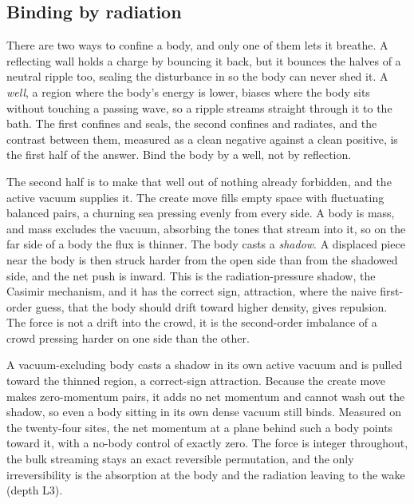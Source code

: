\subsection{Binding by radiation}

There are two ways to confine a body, and only one of them lets it breathe. A reflecting wall holds a charge by bouncing it back, but it bounces the halves of a neutral ripple too, sealing the disturbance in so the body can never shed it. A \emph{well}, a region where the body's energy is lower, biases where the body sits without touching a passing wave, so a ripple streams straight through it to the bath. The first confines and seals, the second confines and radiates, and the contrast between them, measured as a clean negative against a clean positive, is the first half of the answer. Bind the body by a well, not by reflection.

The second half is to make that well out of nothing already forbidden, and the active vacuum supplies it. The create move fills empty space with fluctuating balanced pairs, a churning sea pressing evenly from every side. A body is mass, and mass excludes the vacuum, absorbing the tones that stream into it, so on the far side of a body the flux is thinner. The body casts a \emph{shadow}. A displaced piece near the body is then struck harder from the open side than from the shadowed side, and the net push is inward. This is the radiation-pressure shadow, the Casimir mechanism, and it has the correct sign, attraction, where the naive first-order guess, that the body should drift toward higher density, gives repulsion. The force is not a drift into the crowd, it is the second-order imbalance of a crowd pressing harder on one side than the other.

\begin{result}
A vacuum-excluding body casts a shadow in its own active vacuum and is pulled toward the thinned region, a correct-sign attraction. Because the create move makes zero-momentum pairs, it adds no net momentum and cannot wash out the shadow, so even a body sitting in its own dense vacuum still binds. Measured on the twenty-four sites, the net momentum at a plane behind such a body points toward it, with a no-body control of exactly zero. The force is integer throughout, the bulk streaming stays an exact reversible permutation, and the only irreversibility is the absorption at the body and the radiation leaving to the wake (depth L3).
\end{result}

